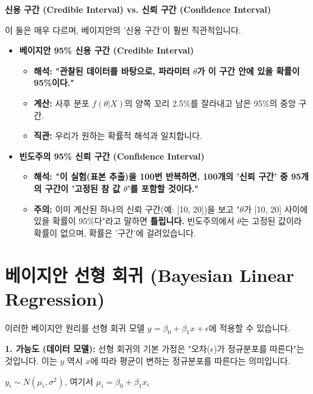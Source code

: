 \documentclass[11pt,a4paper]{book}
\theoremstyle{definition}
\begin{document}
\begin{warningbox}
    \textbf{신용 구간 (Credible Interval) vs. 신뢰 구간 (Confidence Interval)}
    
    이 둘은 매우 다르며, 베이지안의 '신용 구간'이 훨씬 직관적입니다.
    
    \begin{itemize}
        \item \textbf{베이지안 95\% 신용 구간 (Credible Interval)}
            \begin{itemize}
                \item \textbf{해석: "관찰된 데이터를 바탕으로, 파라미터 $\theta$가 이 구간 안에 있을 확률이 95\%이다."}
                \item \textbf{계산:} 사후 분포 $f(\theta | X)$의 양쪽 꼬리 2.5\%를 잘라내고 남은 95\%의 중앙 구간.
                \item \textbf{직관:} 우리가 원하는 확률적 해석과 일치합니다.
            \end{itemize}
        
        \item \textbf{빈도주의 95\% 신뢰 구간 (Confidence Interval)}
            \begin{itemize}
                \item \textbf{해석: "이 실험(표본 추출)을 100번 반복하면, 100개의 '신뢰 구간' 중 95개의 구간이 '고정된 참 값 $\theta$'를 포함할 것이다."}
                \item \textbf{주의:} 이미 계산된 하나의 신뢰 구간(예: [10, 20])을 보고 "$\theta$가 [10, 20] 사이에 있을 확률이 95\%다"라고 말하면 \textbf{틀립니다.}
                빈도주의에서 $\theta$는 고정된 값이라 확률이 없으며, 확률은 '구간'에 걸려있습니다.
            \end{itemize}
    \end{itemize}
\end{warningbox}


\section{베이지안 선형 회귀 (Bayesian Linear Regression)}

이러한 베이지안 원리를 선형 회귀 모델 $y = \beta_0 + \beta_1 x + \epsilon$에 적용할 수 있습니다.

\textbf{1. 가능도 (데이터 모델):}
선형 회귀의 기본 가정은 "오차($\epsilon$)가 정규분포를 따른다"는 것입니다.
이는 $y$ 역시 $x$에 따라 평균이 변하는 정규분포를 따른다는 의미입니다.

$y_i \sim N(\mu_i, \sigma^2)$, 여기서 $\mu_i = \beta_0 + \beta_1 x_i$
\end{document}
